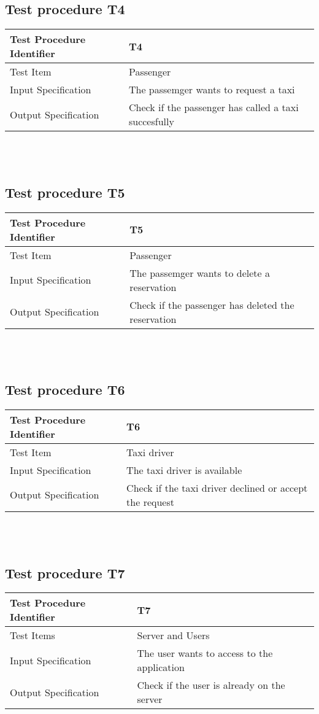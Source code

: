 \documentclass[12pt, oneside]{book}   	%
\begin{document}
\subsection{Test procedure T4}
\begin{tabular}{|l|l|}
\hline
Test Procedure Identifier & T4 \\
\hline
Test Item & Passenger \\
\hline
Input Specification & The passemger wants to request a taxi  \\
\hline
Output Specification & Check if the passenger has called a taxi succesfully\\
\hline
\end{tabular}
\\
\\
\subsection{Test procedure T5}
\begin{tabular}{|l|l|}
\hline
Test Procedure Identifier & T5 \\
\hline
Test Item & Passenger \\
\hline
Input Specification & The passemger wants to delete a reservation \\
\hline
Output Specification & Check if the passenger has deleted the reservation\\
\hline
\end{tabular}
\\
\\
\subsection{Test procedure T6}
\begin{tabular}{|l|l|}
\hline
Test Procedure Identifier & T6 \\
\hline
Test Item & Taxi driver \\
\hline
Input Specification & The taxi driver is available \\
\hline
Output Specification & Check if the taxi driver declined or accept the request\\
\hline
\end{tabular}
\\
\\
\subsection{Test procedure T7}
\begin{tabular}{|l|l|}
\hline
Test Procedure Identifier & T7 \\
\hline
Test Items & Server and Users \\
\hline
Input Specification & The user wants to access to the application \\
\hline
Output Specification & Check if the user is already on the server\\
\hline
\end{tabular}
\\
\\
\end{document}
